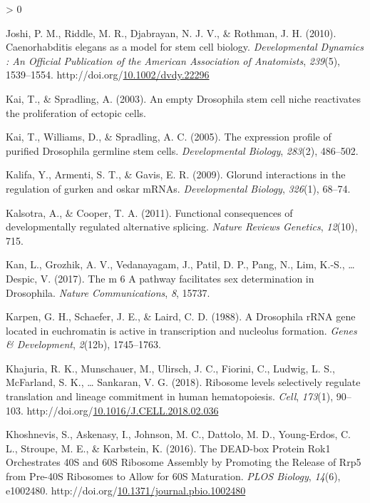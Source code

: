 \documentclass[12pt,oneside]{reedthesis}
\newlength{\cslhangindent}
\newenvironment{CSLReferences}[2] %
 {%
  \setlength{\parindent}{0pt}
  \ifodd #1 \everypar{\setlength{\hangindent}{\cslhangindent}}\ignorespaces\fi
  \ifnum #2 > 0
  \setlength{\parskip}{#2\baselineskip}
  \fi
 }%
 {}
\begin{document}
\begin{CSLReferences}{1}{0}
\leavevmode\hypertarget{ref-Joshi2010l}{}%
Joshi, P. M., Riddle, M. R., Djabrayan, N. J. V., \& Rothman, J. H. (2010). Caenorhabditis elegans as a model for stem cell biology. \emph{Developmental Dynamics : An Official Publication of the American Association of Anatomists}, \emph{239}(5), 1539--1554. http://doi.org/\href{https://doi.org/10.1002/dvdy.22296}{10.1002/dvdy.22296}

\leavevmode\hypertarget{ref-kaiEmptyDrosophilaStem2003}{}%
Kai, T., \& Spradling, A. (2003). An empty {Drosophila} stem cell niche reactivates the proliferation of ectopic cells.

\leavevmode\hypertarget{ref-Kai2005}{}%
Kai, T., Williams, D., \& Spradling, A. C. (2005). The expression profile of purified {Drosophila} germline stem cells. \emph{Developmental Biology}, \emph{283}(2), 486--502.

\leavevmode\hypertarget{ref-Kalifa2009}{}%
Kalifa, Y., Armenti, S. T., \& Gavis, E. R. (2009). Glorund interactions in the regulation of gurken and oskar {mRNAs}. \emph{Developmental Biology}, \emph{326}(1), 68--74.

\leavevmode\hypertarget{ref-Kalsotra2011}{}%
Kalsotra, A., \& Cooper, T. A. (2011). Functional consequences of developmentally regulated alternative splicing. \emph{Nature Reviews Genetics}, \emph{12}(10), 715.

\leavevmode\hypertarget{ref-Kan2017}{}%
Kan, L., Grozhik, A. V., Vedanayagam, J., Patil, D. P., Pang, N., Lim, K.-S., \ldots{} Despic, V. (2017). The m 6 {A} pathway facilitates sex determination in {Drosophila}. \emph{Nature Communications}, \emph{8}, 15737.

\leavevmode\hypertarget{ref-Karpen1988a}{}%
Karpen, G. H., Schaefer, J. E., \& Laird, C. D. (1988). A {Drosophila rRNA} gene located in euchromatin is active in transcription and nucleolus formation. \emph{Genes \& Development}, \emph{2}(12b), 1745--1763.

\leavevmode\hypertarget{ref-Khajuria2018a}{}%
Khajuria, R. K., Munschauer, M., Ulirsch, J. C., Fiorini, C., Ludwig, L. S., McFarland, S. K., \ldots{} Sankaran, V. G. (2018). Ribosome levels selectively regulate translation and lineage commitment in human hematopoiesis. \emph{Cell}, \emph{173}(1), 90--103. http://doi.org/\href{https://doi.org/10.1016/J.CELL.2018.02.036}{10.1016/J.CELL.2018.02.036}

\leavevmode\hypertarget{ref-khoshnevisDEADboxProteinRok12016}{}%
Khoshnevis, S., Askenasy, I., Johnson, M. C., Dattolo, M. D., Young-Erdos, C. L., Stroupe, M. E., \& Karbstein, K. (2016). The {DEAD}-box {Protein Rok1 Orchestrates 40S} and {60S Ribosome Assembly} by {Promoting} the {Release} of {Rrp5} from {Pre}-{40S Ribosomes} to {Allow} for {60S Maturation}. \emph{PLOS Biology}, \emph{14}(6), e1002480. http://doi.org/\href{https://doi.org/10.1371/journal.pbio.1002480}{10.1371/journal.pbio.1002480}


\end{CSLReferences}
\end{document}
